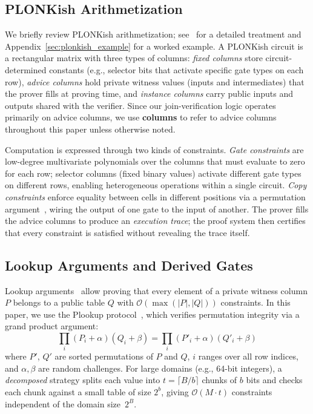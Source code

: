 \documentclass[sigconf]{acmart}
\renewcommand{\emph}[1]{\textit{#1}}
\begin{document}
\subsection{PLONKish Arithmetization}
\label{sec:plonk}
We briefly review PLONKish arithmetization; see~\cite{gu2025poneglyphdb} for a detailed treatment and Appendix~\ref{sec:plonkish_example} for a worked example.
A PLONKish circuit is a rectangular matrix with three types of columns:
\emph{fixed columns} store circuit-determined constants (e.g., selector bits that activate specific gate types on each row),
\emph{advice columns} hold private witness values (inputs and intermediates) that the prover fills at proving time, and
\emph{instance columns} carry public inputs and outputs shared with the verifier.
Since our join-verification logic operates primarily on advice columns, we use \textbf{columns} to refer to advice columns throughout this paper unless otherwise noted.

Computation is expressed through two kinds of constraints.
\emph{Gate constraints} are low-degree multivariate polynomials over the columns that must evaluate to zero for each row; selector columns (fixed binary values) activate different gate types on different rows, enabling heterogeneous operations within a single circuit.
\emph{Copy constraints} enforce equality between cells in different positions via a permutation argument~\cite{gabizon2019plonk}, wiring the output of one gate to the input of another.
The prover fills the advice columns to produce an \emph{execution trace}; the proof system then certifies that every constraint is satisfied without revealing the trace itself.

\subsection{Lookup Arguments and Derived Gates}
\label{subsec:lookup}
Lookup arguments~\cite{gabizon2020plookup, habock2022multivariate} allow proving that every element of a private witness column $P$ belongs to a public table $Q$ with $\mathcal{O}(\max(|P|,|Q|))$ constraints.
In this paper, we use the Plookup protocol~\cite{gabizon2020plookup}, which verifies permutation integrity via a grand product argument:
\begin{equation}
\label{equ:permu}
    \prod_{i} (P_i + \alpha)(Q_i + \beta) = \prod_{i} (P'_i + \alpha)(Q'_i + \beta)
\end{equation}
where $P'$, $Q'$ are sorted permutations of $P$ and $Q$, $i$ ranges over all row indices, and $\alpha,\beta$ are random challenges.
For large domains (e.g., 64-bit integers), a \emph{decomposed} strategy splits each value into $t = \lceil B/b \rceil$ chunks of $b$ bits and checks each chunk against a small table of size $2^b$, giving $\mathcal{O}(M \cdot t)$ constraints independent of the domain size~$2^B$.
\end{document}
